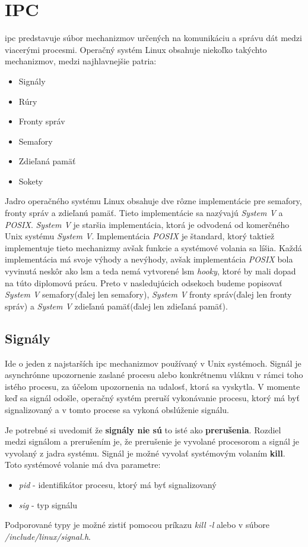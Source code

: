 \section{IPC}
\acrfull{ipc} predstavuje súbor mechanizmov určených na komunikáciu a správu dát medzi viacerými procesmi. Operačný systém Linux obsahuje niekoľko takýchto mechanizmov, medzi najhlavnejšie patria:
\begin{itemize}
\item Signály
\item Rúry
\item Fronty správ
\item Semafory
\item Zdieľaná pamäť
\item Sokety
\end{itemize}
Jadro operačného systému Linux obsahuje dve rôzne implementácie pre semafory, fronty správ a zdieľanú pamäť. Tieto implementácie sa nazývajú \textit{System V} a \textit{POSIX}. \textit{System V} je staršia implementácia, ktorá je odvodená od komerčného Unix systému \textit{System V}. Implementácia \textit{POSIX} je štandard, ktorý taktiež implementuje tieto mechanizmy avšak funkcie a systémové volania sa líšia. Každá implementácia má svoje výhody a nevýhody, avšak implementácia \textit{POSIX} bola vyvinutá neskôr ako \acrshort{lsm} a teda nemá vytvorené \acrshort{lsm} \textit{hooky}, ktoré by mali dopad na túto diplomovú prácu. Preto v nasledujúcich odsekoch budeme popisovať \textit{System V} semafory(ďalej len semafory), \textit{System V} fronty správ(ďalej len fronty správ) a \textit{System V} zdieľanú pamäť(ďalej len zdieľaná pamäť).
\subsection{Signály}
Ide o jeden z najstarších \acrshort{ipc} mechanizmov používaný v Unix systémoch. Signál je asynchrónne upozornenie zaslané procesu alebo konkrétnemu vláknu v rámci toho istého procesu, za účelom upozornenia na udalosť, ktorá sa vyskytla. V momente keď sa signál odošle, operačný systém preruší vykonávanie procesu, ktorý má byť signalizovaný a v tomto procese sa vykoná obslúženie signálu.\cite{signal}

Je potrebné si uvedomiť že \textbf{signály nie sú} to isté ako \textbf{prerušenia}. Rozdiel medzi signálom a prerušením je, že prerušenie je vyvolané procesorom a signál je vyvolaný z jadra systému.
Signál je možné vyvolať systémovým volaním \textbf{kill}. Toto systémové volanie má dva parametre\cite{kill}:
\begin{itemize}
\item \textit{pid} - identifikátor procesu, ktorý má byť signalizovaný
\item \textit{sig} - typ signálu
\end{itemize}
Podporované typy je možné zistiť pomocou príkazu \textit{kill -l} alebo v súbore \textit{/include/linux/signal.h}.

